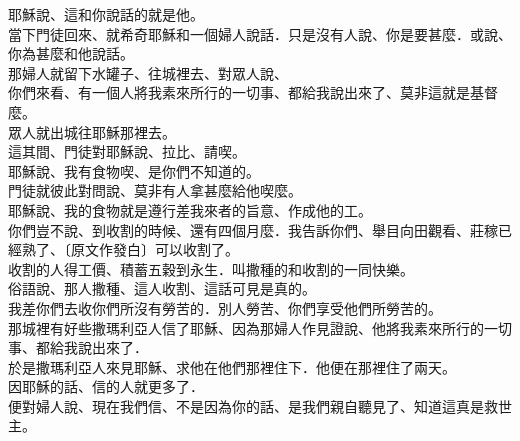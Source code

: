 \documentclass[10pt]{article} %
\begin{document}
\begin{spacing}{0.93}
{\begin{minipage}[t]{\textwidth}
\begin{CJK}{UTF8}{bsmi}
耶穌說、這和你說話的就是他。\\
當下門徒回來、就希奇耶穌和一個婦人說話．只是沒有人說、你是要甚麼．或說、你為甚麼和他說話。\\
那婦人就留下水罐子、往城裡去、對眾人說、\\
你們來看、有一個人將我素來所行的一切事、都給我說出來了、莫非這就是基督麼。\\
眾人就出城往耶穌那裡去。\\
這其間、門徒對耶穌說、拉比、請喫。\\
耶穌說、我有食物喫、是你們不知道的。\\
門徒就彼此對問說、莫非有人拿甚麼給他喫麼。\\
耶穌說、我的食物就是遵行差我來者的旨意、作成他的工。\\
你們豈不說、到收割的時候、還有四個月麼．我告訴你們、舉目向田觀看、莊稼已經熟了、〔原文作發白〕可以收割了。\\
收割的人得工價、積蓄五穀到永生．叫撒種的和收割的一同快樂。\\
俗語說、那人撒種、這人收割、這話可見是真的。\\
我差你們去收你們所沒有勞苦的．別人勞苦、你們享受他們所勞苦的。\\
那城裡有好些撒瑪利亞人信了耶穌、因為那婦人作見證說、他將我素來所行的一切事、都給我說出來了．\\
於是撒瑪利亞人來見耶穌、求他在他們那裡住下．他便在那裡住了兩天。\\
因耶穌的話、信的人就更多了．\\
便對婦人說、現在我們信、不是因為你的話、是我們親自聽見了、知道這真是救世主。\\
\end{CJK}
\end{minipage}}
\end{spacing}
\vspace*{\fill}
\end{document}

